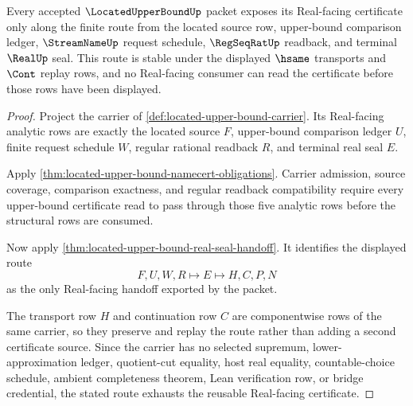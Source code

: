 \begin{theorem}
\label{thm:located-upper-bound-real-certificate-route}
Every accepted $\LocatedUpperBoundUp$ packet exposes its Real-facing certificate only along the finite route from the located source row, upper-bound comparison ledger, $\StreamNameUp$ request schedule, $\RegSeqRatUp$ readback, and terminal $\RealUp$ seal. This route is stable under the displayed $\hsame$ transports and $\Cont$ replay rows, and no Real-facing consumer can read the certificate before those rows have been displayed.
\end{theorem}
\begin{proof}
Project the carrier of \autoref{def:located-upper-bound-carrier}. Its Real-facing analytic rows are exactly the located source $F$, upper-bound comparison ledger $U$, finite request schedule $W$, regular rational readback $R$, and terminal real seal $E$.

Apply \autoref{thm:located-upper-bound-namecert-obligations}. Carrier admission, source coverage, comparison exactness, and regular readback compatibility require every upper-bound certificate read to pass through those five analytic rows before the structural rows are consumed.

Now apply \autoref{thm:located-upper-bound-real-seal-handoff}. It identifies the displayed route
$$
F,U,W,R \longmapsto E \longmapsto H,C,P,N
$$
as the only Real-facing handoff exported by the packet.

The transport row $H$ and continuation row $C$ are componentwise rows of the same carrier, so they preserve and replay the route rather than adding a second certificate source. Since the carrier has no selected supremum, lower-approximation ledger, quotient-cut equality, host real equality, countable-choice schedule, ambient completeness theorem, Lean verification row, or bridge credential, the stated route exhausts the reusable Real-facing certificate.
\end{proof}

